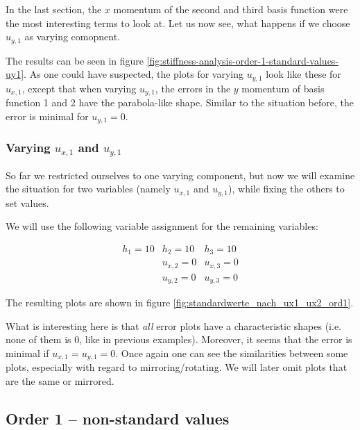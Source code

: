 \documentclass{article}
\begin{document}
In the last section, the $x$ momentum of the second and third basis function were the most interesting terms to look at. Let us now see, what happens if we choose $u_{y,1}$ as varying comopnent.



The results can be seen in figure \ref{fig:stiffness-analysis-order-1-standard-values-uy1}. As one could have suspected, the plots for varying $u_{y,1}$ look like these for $u_{x,1}$, except that when varying $u_{y,1}$, the errors in the $y$ momentum of basis function 1 and 2 have the parabola-like shape. Similar to the situation before, the error is minimal for $u_{y,1}=0$.

\subsubsection{\texorpdfstring{Varying $u_{x,1}$ and $u_{y,1}$}{Varying ux1 and uy1}}

So far we restricted ourselves to one varying component, but now we will examine the situation for two variables (namely $u_{x,1}$ and $u_{y,1}$), while fixing the others to set values.

We will use the following variable assignment for the remaining variables:

\begin{eqnarray*}
  h_1 = 10 & h_2 = 10 & h_3 = 10 \\
   & u_{x,2} = 0 & u_{x,3} = 0 \\
   & u_{y,2} = 0 & u_{y,3} = 0
\end{eqnarray*}

The resulting plots are shown in figure \ref{fig:standardwerte_nach_ux1_ux2_ord1}.



What is interesting here is that \emph{all} error plots have a characteristic shapes (i.e. none of them is 0, like in previous examples). Moreover, it seems that the error is minimal if $u_{x,1}=u_{y,1}=0$. Once again one can see the similarities between some plots, especially with regard to mirroring/rotating. We will later omit plots that are the same or mirrored.

\clearpage{} %

\subsection{Order 1 -- non-standard values}
\label{sec:stiffness-analysis-ord1-non-std-values}
\end{document}
